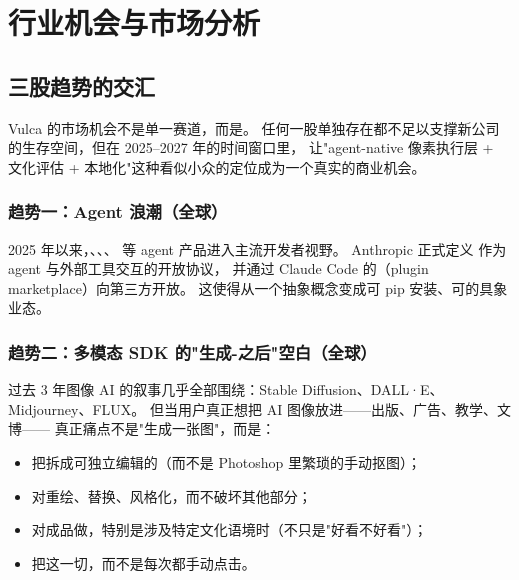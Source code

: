 \section{行业机会与市场分析}
\label{sec:market}

\subsection{三股趋势的交汇}

Vulca 的市场机会不是单一赛道，而是。
任何一股单独存在都不足以支撑新公司的生存空间，但在 2025–2027 年的时间窗口里，
让"agent-native 像素执行层 + 文化评估 + 本地化"这种看似小众的定位成为一个真实的商业机会。

\subsubsection*{趋势一：Agent 浪潮（全球）}

2025 年以来，、、、 等 agent 产品进入主流开发者视野。
Anthropic 正式定义  作为 agent 与外部工具交互的开放协议，
并通过 Claude Code 的（plugin marketplace）向第三方开放。
这使得从一个抽象概念变成可 pip 安装、可的具象业态。


\subsubsection*{趋势二：多模态 SDK 的"生成-之后"空白（全球）}

过去 3 年图像 AI 的叙事几乎全部围绕：Stable Diffusion、DALL·E、Midjourney、FLUX。
但当用户真正想把 AI 图像放进——出版、广告、教学、文博——
真正痛点不是"生成一张图"，而是：

\begin{itemize}
  \item 把拆成可独立编辑的（而不是 Photoshop 里繁琐的手动抠图）；
  \item 对重绘、替换、风格化，而不破坏其他部分；
  \item 对成品做，特别是涉及特定文化语境时（不只是"好看不好看"）；
  \item 把这一切，而不是每次都手动点击。
\end{itemize}

